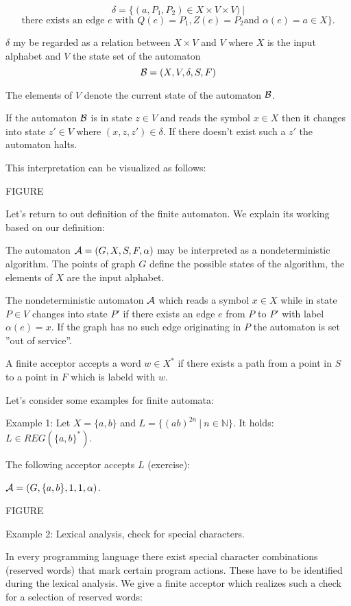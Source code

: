 \[ \delta = \{ (a, P_1, P_2) \in X \times V \times V)\ | \]
\[ \mbox{there exists an edge } e \mbox{ with } Q(e) = P_1, Z(e) = P_2 \mbox{
and } \alpha(e) = a \in X \}. \]

$\delta$ my be regarded as a relation between $X \times V$ and $V$ where $X$ is
the input alphabet and $V$ the state set of the automaton \[ \mbox{$\mathcal{B}$} = (X,
V, \delta, S, F) \]

The elements of $V$ denote the current state of the automaton $\mbox{$\mathcal{B}$}$.

If the automaton $\mbox{$\mathcal{B}$}$ is in state $z \in V$ and reads the symbol $x
\in X$ then it changes into state $z' \in V$ where $(x, z, z') \in \delta$. If
there doesn't exist such a $z'$ the automaton halts.

This interpretation can be visualized as follows:

FIGURE

Let's return to out definition of the finite automaton. We explain its
working based on our definition:

The automaton $\mbox{$\mathcal{A}$} = (G, X, S, F, \alpha)$ may be interpreted as a
nondeterministic algorithm. The points of graph $G$ define the possible states
of the algorithm, the elements of $X$ are the input alphabet.

The nondeterministic automaton $\mbox{$\mathcal{A}$}$ which reads a symbol $x \in X$
while in state $P \in V$ changes into state $P'$ if there exists an edge $e$
from $P$ to $P'$ with label $\alpha(e) = x$. If the graph has no such edge
originating in $P$ the automaton is set ''out of service''.

A finite acceptor accepts a word $w \in X^*$ if there exists a path from a point
in $S$ to a point in $F$ which is labeld with $w$.

Let's consider some examples for finite automata:

Example 1: Let $X = \{ a, b \}$ and $L = \{ (a b)^{2n}\ |\ n \in \mathbb{N} \}$.
It holds: $L \in REG(\{a, b\}^*)$.

The following acceptor accepts $L$ (exercise):

$\mbox{$\mathcal{A}$} = (G, \{a, b\}, {1}, {1}, \alpha)$.

FIGURE

Example 2: Lexical analysis, check for special characters.

In every programming language there exist special character combinations
(reserved words) that mark certain program actions. These have to be identified
during the lexical analysis. We give a finite acceptor which realizes such a check for a selection
of reserved words:

